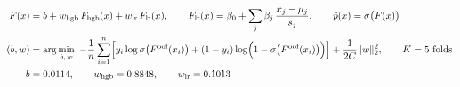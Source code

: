 \begin{align}
F(x) &= b + w_{\text{hgb}}\, F_{\text{hgb}}(x) + w_{\text{lr}}\, F_{\text{lr}}(x), \qquad
F_{\text{lr}}(x) = \beta_0 + \sum_{j} \beta_j\, \frac{x_j - \mu_j}{s_j}, \qquad
\hat{p}(x) = \sigma\bigl(F(x)\bigr) \\
(b, w) &= \arg\min_{b,\,w}\ -\frac{1}{n}\sum_{i=1}^{n}\Bigl[y_i \log \sigma\bigl(F^{\text{oof}}(x_i)\bigr)
+ (1-y_i)\log\Bigl(1-\sigma\bigl(F^{\text{oof}}(x_i)\bigr)\Bigr)\Bigr] + \frac{1}{2C}\lVert w \rVert_2^2,
\qquad K = 5 \text{ folds} \\
b &= 0.0114, \qquad w_{\text{hgb}} = 0.8848, \qquad w_{\text{lr}} = 0.1013
\end{align}
